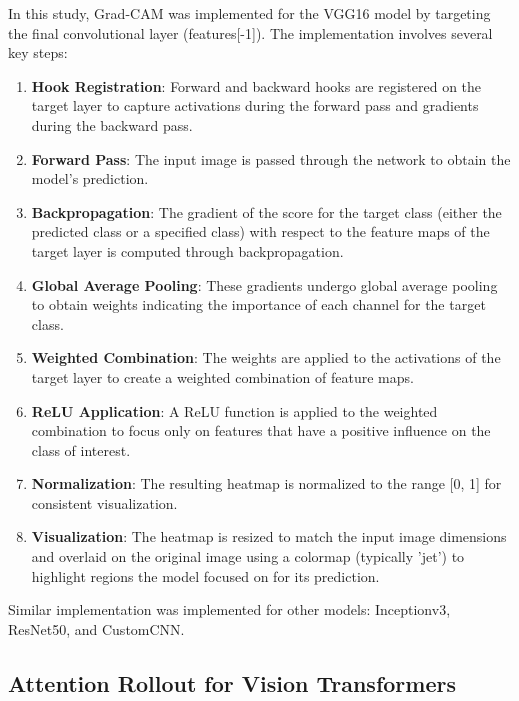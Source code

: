 \documentclass[a4paper,12pt]{report}
\begin{document}
In this study, Grad-CAM was implemented for the VGG16 model by targeting the final convolutional layer (features[-1]). The implementation involves several key steps:

\begin{enumerate}
    \item \textbf{Hook Registration}: Forward and backward hooks are registered on the target layer to capture activations during the forward pass and gradients during the backward pass.
    
    \item \textbf{Forward Pass}: The input image is passed through the network to obtain the model's prediction.
    
    \item \textbf{Backpropagation}: The gradient of the score for the target class (either the predicted class or a specified class) with respect to the feature maps of the target layer is computed through backpropagation.
    
    \item \textbf{Global Average Pooling}: These gradients undergo global average pooling to obtain weights indicating the importance of each channel for the target class.
    
    \item \textbf{Weighted Combination}: The weights are applied to the activations of the target layer to create a weighted combination of feature maps.
    
    \item \textbf{ReLU Application}: A ReLU function is applied to the weighted combination to focus only on features that have a positive influence on the class of interest.
    
    \item \textbf{Normalization}: The resulting heatmap is normalized to the range [0, 1] for consistent visualization.
    
    \item \textbf{Visualization}: The heatmap is resized to match the input image dimensions and overlaid on the original image using a colormap (typically 'jet') to highlight regions the model focused on for its prediction.
\end{enumerate}



Similar implementation was implemented for other models: Inceptionv3, ResNet50, and CustomCNN. 

\subsection{Attention Rollout for Vision Transformers}
\end{document}
